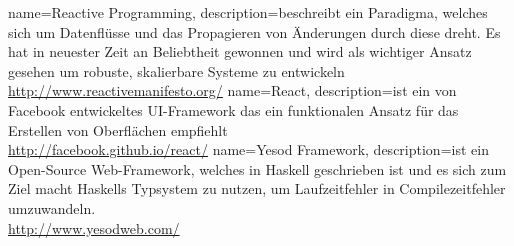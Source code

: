 {
  name=Reactive Programming,
  description={beschreibt ein Paradigma, welches sich um Datenflüsse und das Propagieren von Änderungen durch diese dreht.
  Es hat in neuester Zeit an Beliebtheit gewonnen und wird als wichtiger Ansatz gesehen um robuste, skalierbare Systeme zu entwickeln\\
  \url{http://www.reactivemanifesto.org/}
  }
}
{
  name=React,
  description={ist ein von Facebook entwickeltes UI-Framework das ein funktionalen Ansatz für das Erstellen von Oberflächen empfiehlt\\
  \url{http://facebook.github.io/react/}
  }
}
{
  name=Yesod Framework,
  description={ist ein Open-Source Web-Framework, welches in Haskell geschrieben ist und es sich zum Ziel macht Haskells Typsystem zu nutzen,
  um Laufzeitfehler in Compilezeitfehler umzuwandeln.\\
  \url{http://www.yesodweb.com/}
  }
}

